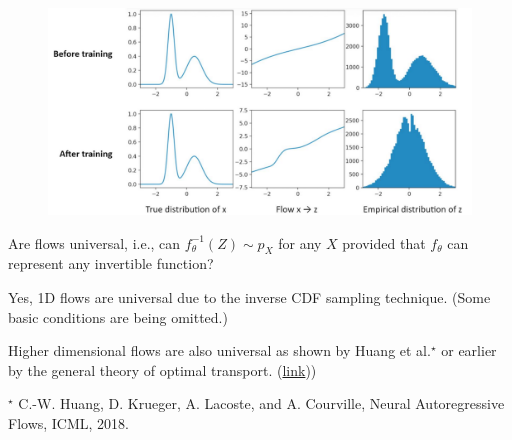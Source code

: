 \documentclass{report}
\begin{document}
\begin{example}
    \begin{figure}[H]
        \centering
        \includegraphics[width=1.0\textwidth]{.././assets/10.10.png}
    \end{figure}
\end{example}

\par\noindent\textcolor{gray}{\hdashrule{\textwidth}{0.4pt}{1pt 2pt}}

\begin{concept}
    Are flows universal, i.e., can $f_{\theta}^{-1}(Z) \sim p_{X}$ for any $X$ provided that $f_{\theta}$ can represent any invertible function?

    Yes, 1D flows are universal due to the inverse CDF sampling technique. (Some basic conditions are being omitted.)

    Higher dimensional flows are also universal as shown by Huang et al.$^{\star}$ or earlier by the general theory of optimal transport. (\href{https://en.wikipedia.org/wiki/Transportation_theory_(mathematics}{link}))

    $^{\star}$ C.-W. Huang, D. Krueger, A. Lacoste, and A. Courville, Neural Autoregressive Flows, ICML, 2018.
\end{concept}
\end{document}
